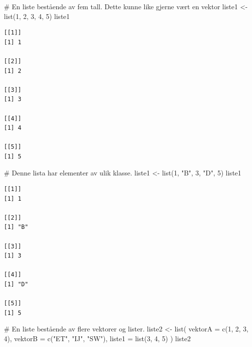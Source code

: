 \documentclass[
  letterpaper,
  DIV=11,
  numbers=noendperiod]{scrreprt}
\newenvironment{Shaded}{\begin{snugshade}}{\end{snugshade}}
\newcommand{\AttributeTok}[1]{\textcolor[rgb]{0.40,0.45,0.13}{#1}}
\newcommand{\CommentTok}[1]{\textcolor[rgb]{0.37,0.37,0.37}{#1}}
\newcommand{\DecValTok}[1]{\textcolor[rgb]{0.68,0.00,0.00}{#1}}
\newcommand{\FunctionTok}[1]{\textcolor[rgb]{0.28,0.35,0.67}{#1}}
\newcommand{\NormalTok}[1]{\textcolor[rgb]{0.00,0.23,0.31}{#1}}
\newcommand{\OtherTok}[1]{\textcolor[rgb]{0.00,0.23,0.31}{#1}}
\newcommand{\StringTok}[1]{\textcolor[rgb]{0.13,0.47,0.30}{#1}}
\begin{document}
\begin{Shaded}
\begin{Highlighting}[]
\CommentTok{\# En liste bestående av fem tall. Dette kunne like gjerne vært en vektor}
\NormalTok{liste1 }\OtherTok{\textless{}{-}} \FunctionTok{list}\NormalTok{(}\DecValTok{1}\NormalTok{, }\DecValTok{2}\NormalTok{, }\DecValTok{3}\NormalTok{, }\DecValTok{4}\NormalTok{, }\DecValTok{5}\NormalTok{)}
\NormalTok{liste1}
\end{Highlighting}
\end{Shaded}

\begin{verbatim}
[[1]]
[1] 1

[[2]]
[1] 2

[[3]]
[1] 3

[[4]]
[1] 4

[[5]]
[1] 5
\end{verbatim}

\begin{Shaded}
\begin{Highlighting}[]
\CommentTok{\# Denne lista har elementer av ulik klasse.}
\NormalTok{liste1 }\OtherTok{\textless{}{-}} \FunctionTok{list}\NormalTok{(}\DecValTok{1}\NormalTok{, }\StringTok{"B"}\NormalTok{, }\DecValTok{3}\NormalTok{, }\StringTok{"D"}\NormalTok{, }\DecValTok{5}\NormalTok{)}
\NormalTok{liste1}
\end{Highlighting}
\end{Shaded}

\begin{verbatim}
[[1]]
[1] 1

[[2]]
[1] "B"

[[3]]
[1] 3

[[4]]
[1] "D"

[[5]]
[1] 5
\end{verbatim}

\begin{Shaded}
\begin{Highlighting}[]
\CommentTok{\# En liste bestående av flere vektorer og lister. }
\NormalTok{liste2 }\OtherTok{\textless{}{-}} \FunctionTok{list}\NormalTok{(}
  \AttributeTok{vektorA =} \FunctionTok{c}\NormalTok{(}\DecValTok{1}\NormalTok{, }\DecValTok{2}\NormalTok{, }\DecValTok{3}\NormalTok{, }\DecValTok{4}\NormalTok{),}
  \AttributeTok{vektorB =} \FunctionTok{c}\NormalTok{(}\StringTok{"ET"}\NormalTok{, }\StringTok{"IJ"}\NormalTok{, }\StringTok{"SW"}\NormalTok{), }
  \AttributeTok{liste1 =} \FunctionTok{list}\NormalTok{(}\DecValTok{3}\NormalTok{, }\DecValTok{4}\NormalTok{, }\DecValTok{5}\NormalTok{)}
\NormalTok{)}
\NormalTok{liste2}
\end{Highlighting}
\end{Shaded}
\end{document}
